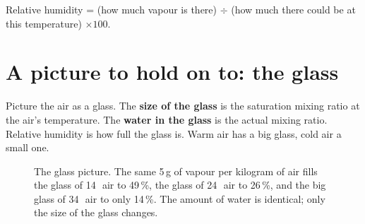 \begin{keybox}
Relative humidity = (how much vapour is there) $\div$ (how much there could be at this temperature) $\times100$.
\end{keybox}

\section{A picture to hold on to: the glass}\label{p3-sec:glass}

Picture the air as a glass. The \textbf{size of the glass} is the saturation mixing ratio at the air's temperature. The \textbf{water in the glass} is the actual mixing ratio. Relative humidity is how full the glass is. Warm air has a big glass, cold air a small one.

\newcommand{\gscale}{0.105}
\newcommand{\glass}[4]{%
  \draw[thick,rounded corners=1.5pt,fill=gray!5] ({#1-0.6},0) rectangle ({#1+0.6},{#2*\gscale});
  \fill[#4!55] ({#1-0.57},0.03) rectangle ({#1+0.57},{#3*\gscale});
  \draw[#4,very thick] ({#1-0.57},{#3*\gscale}) -- ({#1+0.57},{#3*\gscale});}
\begin{figure}[ht]
\centering
{}
\caption{The glass picture. The same 5\,g of vapour per kilogram of air fills the glass of 14\,\degC\ air to 49\,\%, the glass of 24\,\degC\ air to 26\,\%, and the big glass of 34\,\degC\ air to only 14\,\%. The amount of water is identical; only the size of the glass changes.}\label{p3-fig:glass}
\end{figure}

